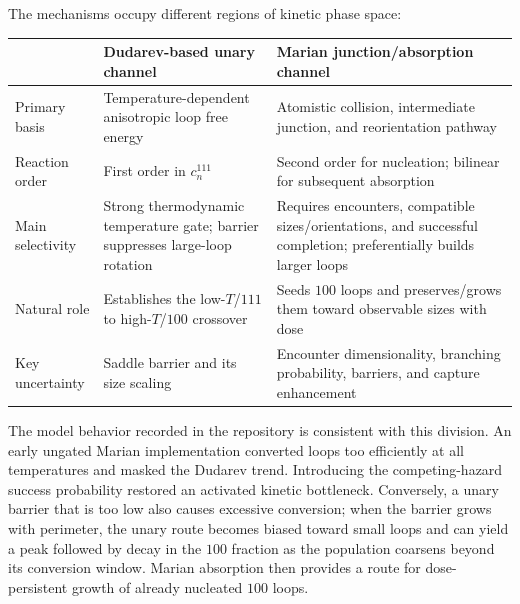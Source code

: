 \documentclass[11pt,a4paper]{article}
\begin{document}
The mechanisms occupy different regions of kinetic phase space:
\begin{center}
\small
\begin{tabular}{>{\raggedright\arraybackslash}p{3.0cm}>{\raggedright\arraybackslash}p{5.7cm}>{\raggedright\arraybackslash}p{5.7cm}}
\toprule
 & Dudarev-based unary channel & Marian junction/absorption channel\\
\midrule
Primary basis & Temperature-dependent anisotropic loop free energy & Atomistic collision, intermediate junction, and reorientation pathway\\
Reaction order & First order in $c_n^{111}$ & Second order for nucleation; bilinear for subsequent absorption\\
Main selectivity & Strong thermodynamic temperature gate; barrier suppresses large-loop rotation & Requires encounters, compatible sizes/orientations, and successful completion; preferentially builds larger loops\\
Natural role & Establishes the low-$T$/$111$ to high-$T$/$100$ crossover & Seeds $100$ loops and preserves/grows them toward observable sizes with dose\\
Key uncertainty & Saddle barrier and its size scaling & Encounter dimensionality, branching probability, barriers, and capture enhancement\\
\bottomrule
\end{tabular}
\end{center}

The model behavior recorded in the repository is consistent with this division.  An early ungated Marian implementation converted loops too efficiently at all temperatures and masked the Dudarev trend.  Introducing the competing-hazard success probability restored an activated kinetic bottleneck.  Conversely, a unary barrier that is too low also causes excessive conversion; when the barrier grows with perimeter, the unary route becomes biased toward small loops and can yield a peak followed by decay in the $100$ fraction as the population coarsens beyond its conversion window.  Marian absorption then provides a route for dose-persistent growth of already nucleated $100$ loops.
\end{document}
